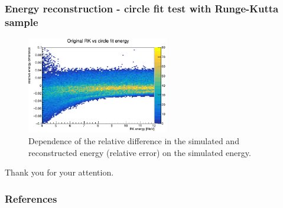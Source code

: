 \documentclass{beamer}
\begin{document}
	\begin{frame}
	\frametitle{Energy reconstruction - circle fit test with Runge-Kutta sample}
		\begin{figure}
			\centering
			\includegraphics[width=0.55\textwidth]{images/rk_energy_reldiff.png}
			\caption{Dependence of the relative difference in the simulated and reconstructed energy (relative error) on the simulated energy.}
		\end{figure}
	\end{frame}
	
	{
		\begin{frame}[noframenumbering]{}
			\begin{center}
				\Huge Thank you for your attention.
			\end{center}
		\end{frame}
	}
	
	\begin{frame}
		\frametitle{References}
		
		
	\end{frame}
	
\end{document}
